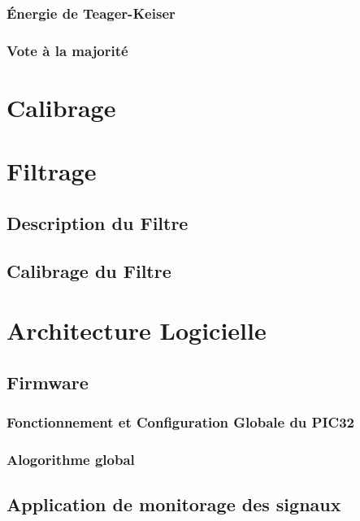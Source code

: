 \documentclass[letterpaper, twoside, 12pt, memoire, creativecommons, hyperref]{thETS}
\begin{document}
\subsubsection{Énergie de Teager-Keiser}

\subsubsection{Vote à la majorité}

\section{Calibrage}

\section{Filtrage}

\subsection{Description du Filtre}

\subsection{Calibrage du Filtre}

\section{Architecture Logicielle}

\subsection{Firmware}

\subsubsection{Fonctionnement et Configuration Globale du PIC32}

\subsubsection{Alogorithme global}

\subsection{Application de monitorage des signaux}
\end{document}
